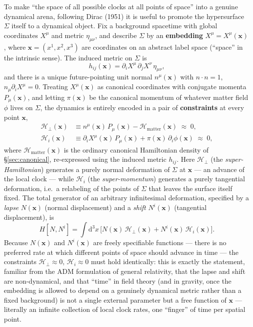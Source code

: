 \documentclass[11pt]{book}
\newcommand{\rd}{\mathrm{d}}
\newcommand{\Ham}{\mathcal{H}}
\theoremstyle{definition}
\theoremstyle{remark}
\begin{document}
To make ``the space of all possible clocks at all points of space'' into a genuine dynamical arena, following Dirac (1951) it is useful to promote the hypersurface $\Sigma$ itself to a dynamical object. Fix a background spacetime with global coordinates $X^\mu$ and metric $\eta_{\mu\nu}$, and describe $\Sigma$ by an \textbf{embedding} $X^\mu=X^\mu(\mathbf{x})$, where $\mathbf{x}=(x^1,x^2,x^3)$ are coordinates on an abstract label space (``space'' in the intrinsic sense). The induced metric on $\Sigma$ is
\begin{equation}
h_{ij}(\mathbf{x}) = \partial_iX^\mu\,\partial_jX^\nu\,\eta_{\mu\nu},
\end{equation}
and there is a unique future-pointing unit normal $n^\mu(\mathbf{x})$ with $n\cdot n=1$, $n_\mu\partial_iX^\mu=0$. Treating $X^\mu(\mathbf{x})$ as canonical coordinates with conjugate momenta $P_\mu(\mathbf{x})$, and letting $\pi(\mathbf{x})$ be the canonical momentum of whatever matter field $\phi$ lives on $\Sigma$, the dynamics is entirely encoded in a pair of \textbf{constraints} at every point $\mathbf{x}$,
\begin{align}
\Ham_\perp(\mathbf{x}) &\equiv n^\mu(\mathbf{x})\,P_\mu(\mathbf{x}) - \Ham_{\mathrm{matter}}(\mathbf{x}) \;\approx\; 0, \label{eq:superham}\\
\Ham_i(\mathbf{x}) &\equiv \partial_iX^\mu(\mathbf{x})\,P_\mu(\mathbf{x}) + \pi(\mathbf{x})\,\partial_i\phi(\mathbf{x}) \;\approx\; 0, \label{eq:supermomentum}
\end{align}
where $\Ham_{\mathrm{matter}}(\mathbf{x})$ is the ordinary canonical Hamiltonian density of \S\ref{sec:canonical}, re-expressed using the induced metric $h_{ij}$. Here $\Ham_\perp$ (the \emph{super-Hamiltonian}) generates a purely normal deformation of $\Sigma$ at $\mathbf{x}$ --- an advance of the local clock --- while $\Ham_i$ (the \emph{super-momentum}) generates a purely tangential deformation, i.e.\ a relabeling of the points of $\Sigma$ that leaves the surface itself fixed. The total generator of an arbitrary infinitesimal deformation, specified by a \emph{lapse} $N(\mathbf{x})$ (normal displacement) and a \emph{shift} $N^i(\mathbf{x})$ (tangential displacement), is
\begin{equation}
H[N,N^i] = \int \rd^3x\, \big[N(\mathbf{x})\,\Ham_\perp(\mathbf{x}) + N^i(\mathbf{x})\,\Ham_i(\mathbf{x})\big].
\end{equation}
Because $N(\mathbf{x})$ and $N^i(\mathbf{x})$ are freely specifiable functions --- there is no preferred rate at which different points of space should advance in time --- the constraints $\Ham_\perp\approx0$, $\Ham_i\approx0$ must hold identically: this is exactly the statement, familiar from the ADM formulation of general relativity, that the lapse and shift are non-dynamical, and that ``time'' in field theory (and in gravity, once the embedding is allowed to depend on a genuinely dynamical metric rather than a fixed background) is not a single external parameter but a free function of $\mathbf{x}$ --- literally an infinite collection of local clock rates, one ``finger'' of time per spatial point.
\end{document}
